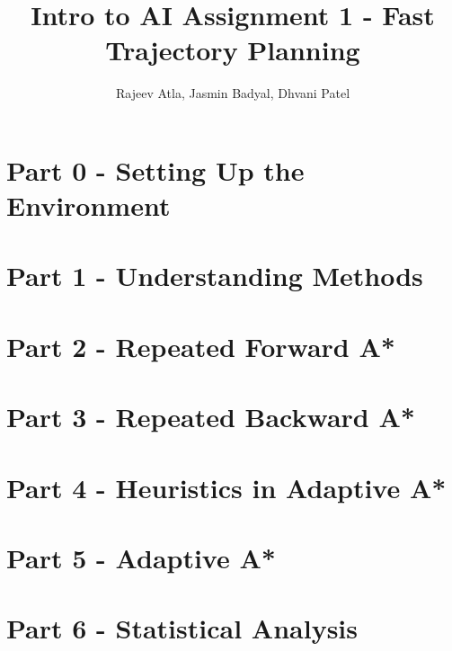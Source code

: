 \documentclass[12pt]{article}
\begin{document}
\title{Intro to AI Assignment 1 - Fast Trajectory Planning}
\author{Rajeev Atla, Jasmin Badyal, Dhvani Patel}
\maketitle



\setcounter{section}{0}
\section{Part 0 - Setting Up the Environment}


\section{Part 1 - Understanding Methods}

\section{Part 2 - Repeated Forward A*}

\section{Part 3 - Repeated Backward A*}

\section{Part 4 - Heuristics in Adaptive A*}

\section{Part 5 - Adaptive A*}

\section{Part 6 - Statistical Analysis}
\end{document}
